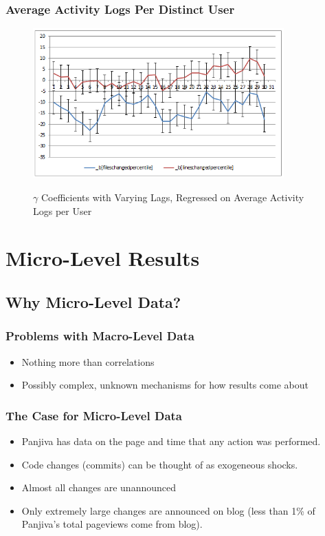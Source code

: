 \documentclass[xcolor=pdftex,dvipsnames,table]{beamer}
\begin{document}
\frame
{
    \frametitle{Average Activity Logs Per Distinct User}
    \begin{figure}[h!]
    \centering
    \includegraphics[width=3.8in]{pictures/avg_activities_time_coefficients.png}
    \label{fig:avg-activities-time-coefficients}
    \caption{$\gamma$ Coefficients with Varying Lags, Regressed on Average Activity Logs per User}
    \end{figure}
}

\section{Micro-Level Results}

\subsection{Why Micro-Level Data?}

\frame{\tableofcontents[currentsubsection]}

\frame
{
    \frametitle{Problems with Macro-Level Data}
    \begin{itemize}
    \item Nothing more than correlations
    \item Possibly complex, unknown mechanisms for how results come about
    \end{itemize}
}

\frame
{
    \frametitle{The Case for Micro-Level Data}
    \begin{itemize}
    \item Panjiva has data on the page and time that any action was performed.
    \item Code changes (commits) can be thought of as exogeneous shocks.
    \item Almost all changes are unannounced
    \item Only extremely large changes are announced on blog (less than 1\% of Panjiva's total pageviews come from blog).
    \end{itemize}
}
\end{document}
